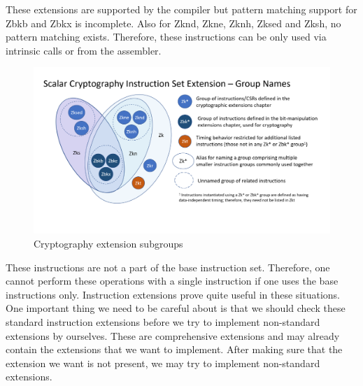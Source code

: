 These extensions are supported by the compiler but pattern matching support for Zbkb and Zbkx is incomplete. Also for Zknd, Zkne, Zknh, Zksed and Zksh, no pattern matching exists. Therefore, these instructions can be only used via intrinsic calls or from the assembler.\cite{llvmextensionspage}

\begin{figure}
    \centering
    \includegraphics{riscv/cryptography_extension_subgroups.png}
    \caption{Cryptography extension subgroups \cite{cryptogroupsdiag}}
    \label{fig:cryptography_extension_subgroups}
\end{figure}

These instructions are not a part of the base instruction set. Therefore, one cannot perform these operations with a single instruction if one uses the base instructions only. Instruction extensions prove quite useful in these situations. One important thing we need to be careful about is that we should check these standard instruction extensions before we try to implement non-standard extensions by ourselves. These are comprehensive extensions and may already contain the extensions that we want to implement. After making sure that the extension we want is not present, we may try to implement non-standard extensions.
